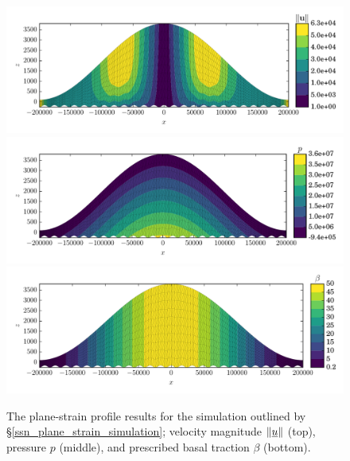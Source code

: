 \begin{figure}
  \centering

    \includegraphics[width=\linewidth]{images/momentum/plane_strain/U_mag.pdf}
    \includegraphics[width=\linewidth]{images/momentum/plane_strain/p.pdf}
    \includegraphics[width=\linewidth]{images/momentum/plane_strain/beta.pdf}

  \caption[Plane-strain momentum experiment solution]{The plane-strain profile results for the simulation outlined by \S \ref{ssn_plane_strain_simulation}; velocity magnitude $\Vert \underline{u} \Vert$ (top), pressure $p$ (middle), and prescribed basal traction $\beta$ (bottom).}
  \label{plane_strain_image}
\end{figure}
